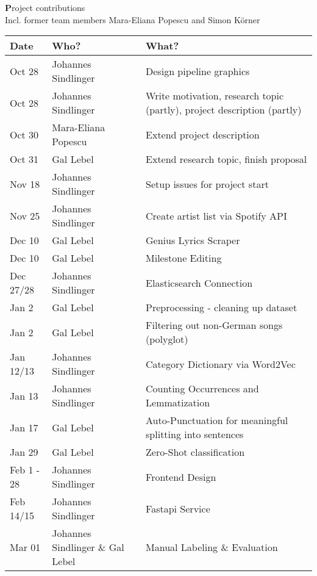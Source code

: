 \thispagestyle{empty}
\newpage
\section*{}
\begin{center}
\large\textbf Project contributions \\
\normalsize Incl. former team members Mara-Eliana Popescu and Simon K{\"o}rner
\end{center}

\vspace*{1cm}

\begin{table}[!ht]
    \centering
    \begin{tabularx}{\textwidth}{|l|p{4cm}|X|}
    \hline
        \textbf{Date} & \textbf{Who?} & \textbf{What?} \\ \hline
        Oct 28 & Johannes Sindlinger & Design pipeline graphics \\ \hline
        Oct 28 & Johannes Sindlinger & Write motivation, research topic (partly), project description (partly) \\ \hline
        Oct 30 & Mara-Eliana Popescu & Extend project description \\ \hline
        Oct 31 & Gal Lebel & Extend research topic, finish proposal \\ \hline
        Nov 18 & Johannes Sindlinger & Setup issues for project start \\ \hline
        Nov 25 & Johannes Sindlinger & Create artist list via Spotify API \\ \hline
        Dec 10 & Gal Lebel & Genius Lyrics Scraper \\ \hline
        Dec 10 & Gal Lebel & Milestone Editing \\ \hline
        Dec 27/28 & Johannes Sindlinger & Elasticsearch Connection \\ \hline
        Jan 2 & Gal Lebel & Preprocessing - cleaning up dataset \\ \hline
        Jan 2 & Gal Lebel & Filtering out non-German songs (polyglot) \\ \hline
        Jan 12/13 & Johannes Sindlinger & Category Dictionary via Word2Vec \\ \hline
        Jan 13 & Johannes Sindlinger & Counting Occurrences and Lemmatization \\ \hline
        Jan 17 & Gal Lebel & Auto-Punctuation for meaningful splitting into sentences \\ \hline
        Jan 29 & Gal Lebel & Zero-Shot classification \\ \hline
        Feb 1 - 28 & Johannes Sindlinger & Frontend Design \\ \hline
        Feb 14/15 & Johannes Sindlinger & Fastapi Service \\ \hline
        Mar 01 & Johannes Sindlinger \& Gal Lebel & Manual Labeling \& Evaluation \\ \hline
    \end{tabularx}
\end{table}


